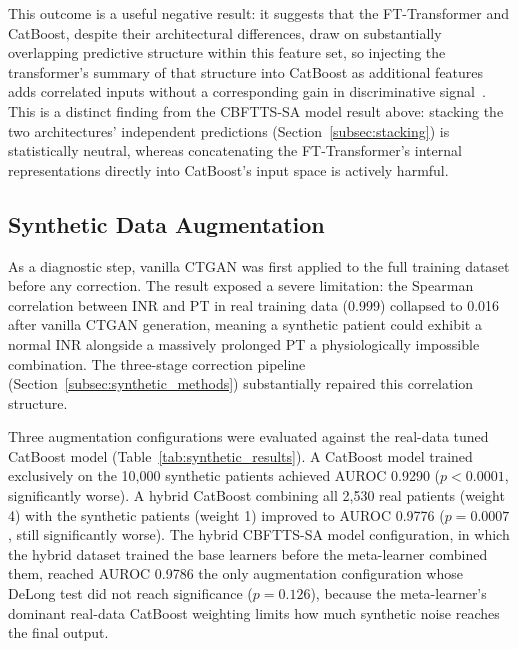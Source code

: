 \documentclass[final,3p,times]{elsarticle}
\begin{document}
This outcome is a useful negative result: it suggests that the
FT-Transformer and CatBoost, despite their architectural differences,
draw on substantially overlapping predictive structure within this
feature set, so injecting the transformer's summary of that structure
into CatBoost as additional features adds correlated inputs without
a corresponding gain in discriminative signal~\cite{gorishniy2021}.
This is a distinct finding from the CBFTTS-SA model result above: stacking
the two architectures' independent predictions (Section~\ref{subsec:stacking})
is statistically neutral, whereas concatenating the FT-Transformer's
internal representations directly into CatBoost's input space is
actively harmful.

\subsection{Synthetic Data Augmentation}
\label{subsec:synthetic}

As a diagnostic step, vanilla CTGAN was first applied to the full
training dataset before any correction. The result exposed a severe
limitation: the Spearman correlation between INR and PT in real
training data (0.999) collapsed to 0.016 after vanilla CTGAN
generation, meaning a synthetic patient could exhibit a normal INR
alongside a massively prolonged PT  a physiologically impossible
combination. The three-stage correction pipeline
(Section~\ref{subsec:synthetic_methods}) substantially repaired
this correlation structure.

Three augmentation configurations were evaluated against the
real-data tuned CatBoost model (Table~\ref{tab:synthetic_results}).
A CatBoost model trained exclusively on the 10,000 synthetic
patients achieved AUROC 0.9290 ($p < 0.0001$, significantly worse).
A hybrid CatBoost combining all 2,530 real patients (weight 4) with
the synthetic patients (weight 1) improved to AUROC 0.9776
($p = 0.0007$, still significantly worse). The hybrid CBFTTS-SA model
configuration, in which the hybrid dataset trained the base
learners before the meta-learner combined them, reached AUROC
0.9786  the only augmentation configuration whose DeLong test did
not reach significance ($p = 0.126$), because the meta-learner's
dominant real-data CatBoost weighting limits how much synthetic
noise reaches the final output.
\end{document}
